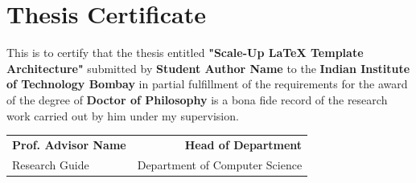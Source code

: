 \chapter*{Thesis Certificate}
This is to certify that the thesis entitled \textbf{"Scale-Up LaTeX Template Architecture"} submitted by \textbf{Student Author Name} to the \textbf{Indian Institute of Technology Bombay} in partial fulfillment of the requirements for the award of the degree of \textbf{Doctor of Philosophy} is a bona fide record of the research work carried out by him under my supervision.

\vspace{2cm}
\noindent
\begin{tabular*}{\textwidth}{@{\extracolsep{\fill}}lr}
    \textbf{Prof. Advisor Name} & \textbf{Head of Department} \\
    Research Guide & Department of Computer Science
\end{tabular*}
